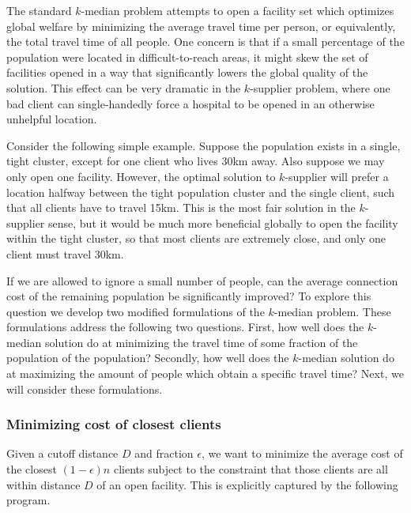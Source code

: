 
The standard $k$-median problem attempts to open a facility set which optimizes global welfare by minimizing the average travel time per person, or equivalently, the total travel time of all people. One concern is that if a small percentage of the population were located in difficult-to-reach areas, it might skew the set of facilities opened in a way that significantly lowers the global quality of the solution. This effect can be very dramatic in the $k$-supplier problem, where one bad client can single-handedly force a hospital to be opened in an otherwise unhelpful location. 

Consider the following simple example. Suppose the population exists in a single, tight cluster, except for one client who lives 30km away. Also suppose we may only open one facility.  However, the optimal solution to $k$-supplier will prefer a location halfway between the tight population cluster and the single client, such that all clients have to travel 15km. This is the most fair solution in the $k$-supplier sense, but it would be much more beneficial globally to open the facility within the tight cluster, so that most clients are extremely close, and only one client must travel 30km. 

If we are allowed to ignore a small number of people, can the average connection cost of the remaining population be significantly improved? To explore this question we develop two modified formulations of the $k$-median problem. These formulations address the following two questions. First, how well does the $k$-median solution do at minimizing the travel time of some fraction of the population of the population? Secondly, how well does the $k$-median solution do at maximizing the amount of people which obtain a specific travel time? Next, we will consider these formulations.

\subsubsection*{Minimizing cost of closest clients}
Given a cutoff distance $D$ and fraction $\epsilon$, we want to minimize the average cost of the closest $(1-\epsilon)n$ clients subject to the constraint that those clients are all within distance $D$ of an open facility. This is explicitly captured by the following program.

